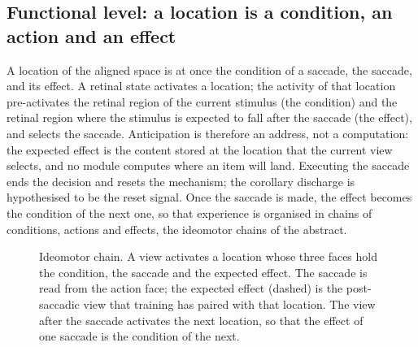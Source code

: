 \documentclass[14pt]{article}
\begin{document}
\subsection{Functional level: a location is a condition, an action and an effect}

A location of the aligned space is at once the condition of a saccade, the saccade, and its effect.
A retinal state activates a location; the activity of that location pre-activates the retinal region of the current stimulus (the condition) and the retinal region where the stimulus is expected to fall after the saccade (the effect), and selects the saccade.
Anticipation is therefore an address, not a computation: the expected effect is the content stored at the location that the current view selects, and no module computes where an item will land.
Executing the saccade ends the decision and resets the mechanism; the corollary discharge is hypothesised to be the reset signal.
Once the saccade is made, the effect becomes the condition of the next one, so that experience is organised in chains of conditions, actions and effects, the ideomotor chains of the abstract.

\begin{figure}
    \centering
    \caption{Ideomotor chain. A view activates a location whose three faces hold the condition, the saccade and the expected effect. The saccade is read from the action face; the expected effect (dashed) is the post-saccadic view that training has paired with that location. The view after the saccade activates the next location, so that the effect of one saccade is the condition of the next.}
    \label{fig:chain}
\end{figure}
\end{document}
